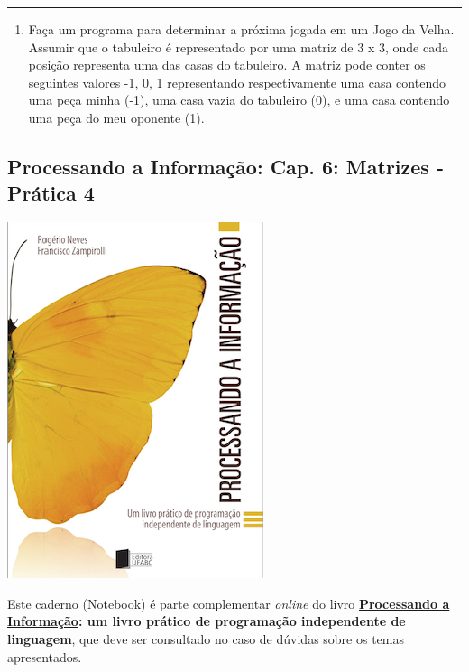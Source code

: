 \documentclass[12pt,a4paper]{article}
\providecommand{\tightlist}{%
      \setlength{\itemsep}{0pt}\setlength{\parskip}{0pt}}
\begin{document}
    \begin{center}\rule{0.5\linewidth}{0.5pt}\end{center}

\begin{enumerate}
\def\labelenumi{\arabic{enumi}.}
\setcounter{enumi}{7}
\tightlist
\item
  Faça um programa para determinar a próxima jogada em um Jogo da Velha.
  Assumir que o tabuleiro é representado por uma matriz de 3 x 3, onde
  cada posição representa uma das casas do tabuleiro. A matriz pode
  conter os seguintes valores -1, 0, 1 representando respectivamente uma
  casa contendo uma peça minha (-1), uma casa vazia do tabuleiro (0), e
  uma casa contendo uma peça do meu oponente (1).
\end{enumerate}

    \hypertarget{processando-a-informauxe7uxe3o-cap.-6-matrizes---pruxe1tica-4}{%
\subsection{Processando a Informação: Cap. 6: Matrizes - Prática
4}\label{processando-a-informauxe7uxe3o-cap.-6-matrizes---pruxe1tica-4}}

    \includegraphics{"figs/Capa_Processando_Informacao.jpg"}

Este caderno (Notebook) é parte complementar \emph{online} do livro
\textbf{\href{https://editora.ufabc.edu.br/matematica-e-ciencias-da-computacao/58-processando-a-informacao}{Processando
a Informação}: um livro prático de programação independente de
linguagem}, que deve ser consultado no caso de dúvidas sobre os temas
apresentados.
\end{document}
